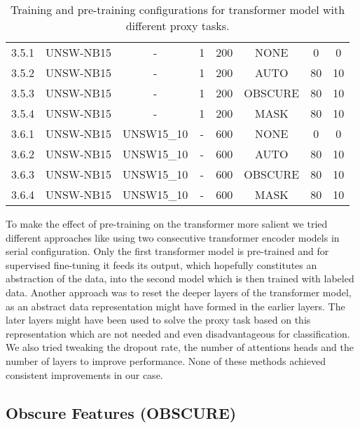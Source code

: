 \begin{table}[H]
{\begin{tabular}{cccccccc}
		3.5.1 & UNSW-NB15    & -          & 1           & 200           & NONE       & 0         & 0           \\
		3.5.2 & UNSW-NB15    & -          & 1           & 200           & AUTO       & 80        & 10          \\
		3.5.3 & UNSW-NB15    & -          & 1           & 200           & OBSCURE      & 80        & 10          \\
		3.5.4 & UNSW-NB15    & -          & 1           & 200           & MASK      & 80        & 10          \\
		3.6.1 & UNSW-NB15    & UNSW15\_10 & -           & 600           & NONE       & 0         & 0           \\
		3.6.2 & UNSW-NB15    & UNSW15\_10 & -           & 600           & AUTO       & 80        & 10          \\
		3.6.3 & UNSW-NB15    & UNSW15\_10 & -           & 600           & OBSCURE      & 80        & 10          \\
		3.6.4 & UNSW-NB15    & UNSW15\_10 & -           & 600           & MASK      & 80        & 10         
	\end{tabular}}
	\caption{Training and pre-training configurations for transformer model with different proxy tasks.}
	\label{table:experiments:transformer:configurations}
\end{table}

To make the effect of pre-training on the transformer more salient we tried different approaches like using two consecutive transformer encoder models in serial configuration. Only the first transformer model is pre-trained and for supervised fine-tuning it feeds its output, which hopefully constitutes an abstraction of the data, into the second model which is then trained with labeled data.
Another approach was to reset the deeper layers of the transformer model, as an abstract data representation might have formed in the earlier layers. The later layers might have been used to solve the proxy task based on this representation which are not needed and even disadvantageous for classification. We also tried tweaking the dropout rate, the number of attentions heads and the number of layers to improve performance. None of these methods achieved consistent improvements in our case.


\subsection{Obscure Features (OBSCURE)} \label{sec:experiments:transformer:mask_feature}

